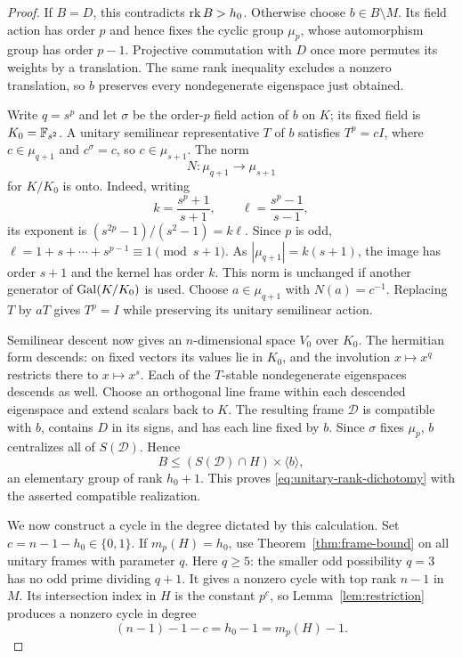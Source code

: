 \begin{proof}
If $B=D$, this contradicts $\operatorname{rk} B>h_0$.  Otherwise choose
$b\in B\setminus M$.  Its field action has order $p$ and hence fixes
the cyclic group $\mu_p$, whose automorphism group has order $p-1$.
Projective commutation with $D$ once more permutes its weights by a
translation.  The same rank inequality excludes a nonzero translation,
so $b$ preserves every nondegenerate eigenspace just obtained.

Write $q=s^p$ and let $\sigma$ be the order-$p$ field action of $b$
on $K$; its fixed field is $K_0=\mathbb F_{s^2}$.  A unitary semilinear
representative $T$ of $b$ satisfies $T^p=cI$, where
$c\in\mu_{q+1}$ and $c^\sigma=c$, so $c\in\mu_{s+1}$.
The norm
\begin{equation}\label{eq:unitary-norm}
 N:\mu_{q+1}\longrightarrow\mu_{s+1}
\end{equation}
for $K/K_0$ is onto.  Indeed, writing
\[
 k=\frac{s^p+1}{s+1},\qquad
 \ell=\frac{s^p-1}{s-1},
\]
its exponent is $(s^{2p}-1)/(s^2-1)=k\ell$.
Since $p$ is odd, $\ell=1+s+\cdots+s^{p-1}\equiv1\pmod{s+1}$.
As $|\mu_{q+1}|=k(s+1)$, the image has order $s+1$ and the kernel
has order $k$.  This norm is unchanged if another generator of
$\operatorname{Gal}(K/K_0)$ is used.  Choose $a\in\mu_{q+1}$ with $N(a)=c^{-1}$.
Replacing $T$ by $aT$ gives $T^p=I$ while preserving its unitary
semilinear action.

Semilinear descent now gives an $n$-dimensional space $V_0$ over $K_0$.
The hermitian form descends: on fixed vectors its values lie in $K_0$,
and the involution $x\mapsto x^q$ restricts there to $x\mapsto x^s$.
Each of the $T$-stable nondegenerate eigenspaces descends as well.
Choose an orthogonal line frame within each descended eigenspace and
extend scalars back to $K$.  The resulting frame $\mathcal D$ is
compatible with $b$, contains $D$ in its signs, and has each line fixed
by $b$.  Since $\sigma$ fixes $\mu_p$, $b$ centralizes all of
$S(\mathcal D)$.  Hence
\[
 B\le (S(\mathcal D)\cap H)\times\langle b\rangle,
\]
an elementary group of rank $h_0+1$.  This proves
\eqref{eq:unitary-rank-dichotomy} with the asserted compatible realization.

We now construct a cycle in the degree dictated by this calculation.
Set $c=n-1-h_0\in\{0,1\}$.  If $m_p(H)=h_0$, use
Theorem~\ref{thm:frame-bound} on all unitary frames with parameter $q$.
Here $q\ge5$: the smaller odd possibility $q=3$ has no odd prime
dividing $q+1$.  It gives a nonzero cycle with top rank $n-1$ in
$M$.  Its intersection index in $H$ is the constant $p^c$, so
Lemma~\ref{lem:restriction} produces a nonzero cycle in degree
\begin{equation}\label{eq:unitary-undecorated-degree}
 (n-1)-1-c=h_0-1=m_p(H)-1.
\end{equation}


\end{proof}
